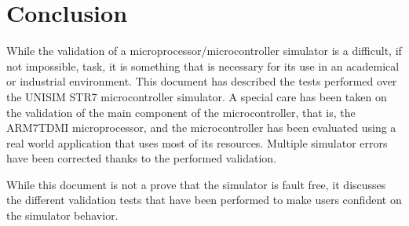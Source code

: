 \section{Conclusion}
\label{sec:str7_validation_conclusion}

While the validation of a microprocessor/microcontroller simulator is a difficult, if not impossible, task, it is something that is necessary for its use in an academical or industrial environment.
This document has described the tests performed over the UNISIM STR7 microcontroller simulator.
A special care has been taken on the validation of the main component of the microcontroller, that is, the ARM7TDMI microprocessor, and the microcontroller has been evaluated using a real world application that uses most of its resources.
Multiple simulator errors have been corrected thanks to the performed validation.

While this document is not a prove that the simulator is fault free, it discusses the different validation tests that have been performed to make users confident on the simulator behavior.

